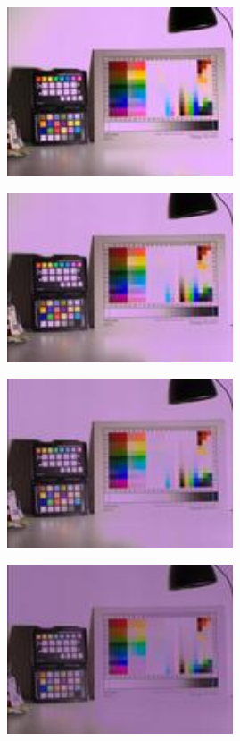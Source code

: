 {\begin{center}
\includegraphics[height=5cm]{images/100ms-1ms-8-tiny}
\end{center}

\begin{center}
\includegraphics[height=5cm]{images/100ms-1ms-16-tiny}
\end{center}

\begin{center}
\includegraphics[height=5cm]{images/100ms-1ms-24-tiny}
\end{center}

\begin{center}
\includegraphics[height=5cm]{images/100ms-1ms-32-tiny}
\end{center}

}
